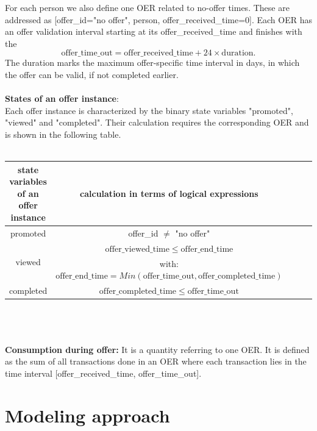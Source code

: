 \documentclass[11pt]{article} %
\begin{document}
For each person we also define one OER related to no-offer times.
These are addressed as [offer\_id="no offer", person, offer\_received\_time=0].
Each OER has an offer validation interval starting at its offer\_received\_time and finishes with the $$\mathrm{offer\_time\_out}=\mathrm{offer\_received\_time}+24 \times \mathrm{duration}.$$ 
The duration marks the maximum offer-specific time interval in days, in which the offer can be valid, if not completed earlier.
\\
\\
\textbf{States of an offer instance}: 
\\
Each offer instance is characterized by the binary state variables "promoted", "viewed" and "completed".
Their calculation requires the corresponding OER and is shown in the following table.
\\
\\
\begin{tabular}{|c||c|c|c|c|}
 \hline
state variables of an offer instance & calculation in terms of logical expressions \\ 
\hline
\hline
promoted & offer\_id $\ne$ "no offer"\\ 
\hline
\multirow{ 2}{*}{viewed} &  $\mathrm{offer\_viewed\_time} \le \mathrm{offer\_end\_time}$\\ 
&  with: $ \mathrm{offer\_end\_time}=Min(\mathrm{offer\_time\_out},\mathrm{ offer\_completed\_time})$\\ 
\hline
completed & $\mathrm{ offer\_completed\_time} \le \mathrm{offer\_time\_out} $ \\ 
\hline
\end{tabular}
\\
\\
\\
\textbf{Consumption during offer:}
It is a quantity referring to one OER.
It is defined as the sum of all transactions done in an OER where each transaction lies in the time interval [offer\_received\_time, offer\_time\_out].


\section{Modeling approach}
\end{document}
